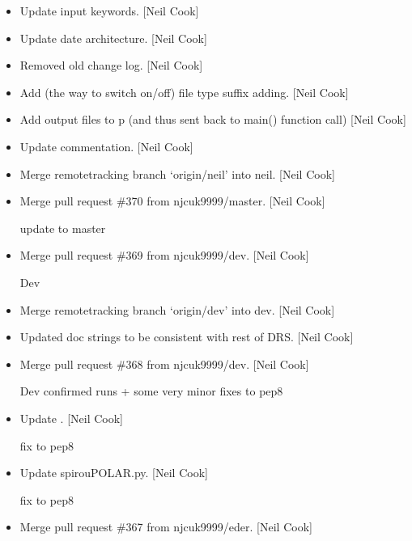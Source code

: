 \documentclass[a4paper,10pt,english]{report}
\begin{document}
\begin{itemize}
\item {} 
Update input keywords. {[}Neil Cook{]}

\item {} 
Update date architecture. {[}Neil Cook{]}

\item {} 
Removed old change log. {[}Neil Cook{]}

\item {} 
Add  (the way to switch on/off) file type suffix adding. {[}Neil
Cook{]}

\item {} 
Add output files to p (and thus sent back to main() function call)
{[}Neil Cook{]}

\item {} 
Update commentation. {[}Neil Cook{]}

\item {} 
Merge remote\sphinxhyphen{}tracking branch ‘origin/neil’ into neil. {[}Neil Cook{]}

\item {} 
Merge pull request \#370 from njcuk9999/master. {[}Neil Cook{]}

update to master

\item {} 
Merge pull request \#369 from njcuk9999/dev. {[}Neil Cook{]}

Dev

\item {} 
Merge remote\sphinxhyphen{}tracking branch ‘origin/dev’ into dev. {[}Neil Cook{]}

\item {} 
Updated doc strings to be consistent with rest of DRS. {[}Neil Cook{]}

\item {} 
Merge pull request \#368 from njcuk9999/dev. {[}Neil Cook{]}

Dev \sphinxhyphen{} confirmed runs + some very minor fixes to pep8

\item {} 
Update . {[}Neil Cook{]}

fix to pep8

\item {} 
Update spirouPOLAR.py. {[}Neil Cook{]}

fix to pep8

\item {} 
Merge pull request \#367 from njcuk9999/eder. {[}Neil Cook{]}


\end{itemize}
\end{document}
